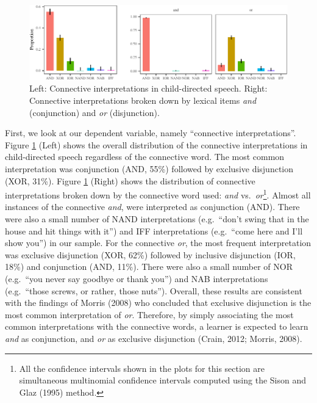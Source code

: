 \documentclass[,man,floatsintext]{apa6}
\let\rmarkdownfootnote\footnote%
\def\footnote{\protect\rmarkdownfootnote}
\begin{document}
\begin{figure}[tb]

{\centering \includegraphics{figs/interpretationPlot-1} 

}

\caption{Left: Connective interpretations in child-directed speech. Right: Connective interpretations broken down by lexical items \textit{and} (conjunction) and \textit{or} (disjunction).}\label{fig:interpretationPlot}
\end{figure}

First, we look at our dependent variable, namely \enquote{connective interpretations}. Figure \ref{fig:interpretationPlot} (Left) shows the overall distribution of the connective interpretations in child-directed speech regardless of the connective word. The most common interpretation was conjunction (AND, 55\%) followed by exclusive disjunction (XOR, 31\%). Figure \ref{fig:interpretationPlot} (Right) shows the distribution of connective interpretations broken down by the connective word used: \emph{and} vs.~\emph{or}\footnote{All the confidence intervals shown in the plots for this section are simultaneous multinomial confidence intervals computed using the Sison and Glaz (1995) method.}. Almost all instances of the connective \emph{and}, were interpreted as conjunction (AND). There were also a small number of NAND interpretations (e.g.~\enquote{don't swing that in the house and hit things with it}) and IFF interpretations (e.g.~\enquote{come here and I'll show you}) in our sample. For the connective \emph{or}, the most frequent interpretation was exclusive disjunction (XOR, 62\%) followed by inclusive disjunction (IOR, 18\%) and conjunction (AND, 11\%). There were also a small number of NOR (e.g.~\enquote{you never say goodbye or thank you}) and NAB interpretations (e.g.~\enquote{those screws, or rather, those nuts}). Overall, these results are consistent with the findings of Morris (2008) who concluded that exclusive disjunction is the most common interpretation of \emph{or}. Therefore, by simply associating the most common interpretations with the connective words, a learner is expected to learn \emph{and} as conjunction, and \emph{or} as exclusive disjunction (Crain, 2012; Morris, 2008).
\end{document}
